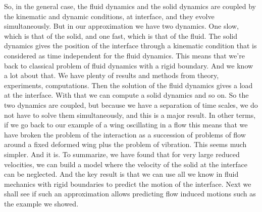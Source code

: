 \documentclass{article}
\begin{document}
 So, in the general case,
the fluid dynamics and the solid dynamics are coupled
by the kinematic and dynamic conditions, at interface,
and they evolve simultaneously. But in our approximation
we have two dynamics. One slow, which is that of the solid, and
one fast, which is that of the fluid. The solid dynamics gives the position
of the interface through a kinematic condition that is considered as time
independent for the fluid dynamics. This means that we're back to
classical problem of fluid dynamics with a rigid boundary. And we know a lot about that. We have plenty of results and methods
from theory, experiments, computations. Then the solution of the fluid dynamics
gives a load at the interface. With that we can compute
a solid dynamics and so on. So the two dynamics are coupled, but because we have a separation of time
scales, we do not have to solve them simultaneously, and
this is a major result. In other terms, if we go back to our
example of a wing oscillating in a flow this means that we have broken
the problem of the interaction as a succession of problems of
flow around a fixed deformed wing plus the problem of vibration. This seems much simpler. And it is. To summarize, we have found that for
 very large reduced velocities, we can build a model where the velocity of
the solid at the  interface can be neglected. And the key result is that
we can use all we know in fluid mechanics with rigid boundaries
to predict the motion of the interface. Next we shall see if such
an approximation allows predicting flow induced motions
such as the example we showed. 
\end{document}
